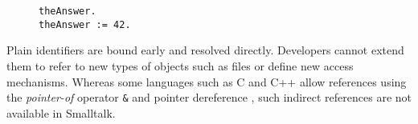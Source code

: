 \documentclass[preprint,authoryear]{llncs}
\begin{document}
\begin{figure}[htbp]
\begin{lstlisting}[style=numbers,label=variable-lookup,caption=Retrieve and store value via plain identifier.]
theAnswer.
theAnswer := 42.
\end{lstlisting}
\end{figure}

Plain identifiers are bound early and resolved directly.
Developers cannot extend them to refer to
new types of objects such as files or define new access mechanisms.  Whereas some languages
such as C and C++ allow references using the {\em pointer-of} operator {\tt \&} and pointer
dereference {\tt *}, such indirect references are not available in Smalltalk.








\end{document}

